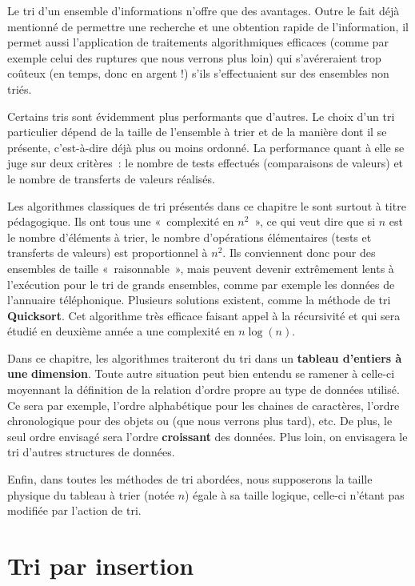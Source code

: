 	Le tri d’un ensemble d’informations n’offre que des avantages. Outre le
	fait déjà mentionné de permettre une recherche et une obtention rapide
	de l’information, il permet aussi l’application de traitements
	algorithmiques efficaces (comme par exemple celui des ruptures que nous
	verrons plus loin) qui s’avéreraient trop coûteux (en temps, donc en
	argent !) s’ils s’effectuaient sur des ensembles non triés.

	Certains tris sont évidemment plus performants que d’autres. Le choix
	d’un tri particulier dépend de la taille de l’ensemble à trier et de la
	manière dont il se présente, c’est-à-dire déjà plus ou moins ordonné.
	La performance quant à elle se juge sur deux critères~: le nombre de
	tests effectués (comparaisons de valeurs) et le nombre de transferts de
	valeurs réalisés. 
	
	Les algorithmes classiques de tri présentés dans ce chapitre le sont
	surtout à titre pédagogique. Ils ont tous une «~complexité en
	$n^2$~», ce qui veut dire que si $n$ est le nombre
	d’éléments à trier, le nombre d’opérations élémentaires (tests et
	transferts de valeurs) est proportionnel à $n^2$. Ils conviennent
	donc pour des ensembles de taille «~raisonnable~», mais peuvent devenir
	extrêmement lents à l’exécution pour le tri de grands ensembles, comme
	par exemple les données de l’annuaire téléphonique. Plusieurs solutions
	existent, comme la méthode de tri \textbf{Quicksort}. Cet algorithme
	très efficace faisant appel à la récursivité et qui sera étudié en
	deuxième année a une complexité en $n \log(n)$. 

	Dans ce chapitre, les algorithmes traiteront du tri dans un
	\textbf{tableau d’entiers à une }\textbf{dimension}. Toute autre
	situation peut bien entendu se ramener à celle-ci moyennant la
	définition de la relation d’ordre propre au type de données utilisé. Ce
	sera par exemple, l’ordre alphabétique pour les chaines de caractères,
	l’ordre chronologique pour des objets  ou
	 (que nous verrons
	plus tard), etc. De plus, le seul ordre envisagé sera l’ordre
	\textbf{croissant} des données. Plus loin, on envisagera le tri 
	d'autres structures de données.

	Enfin, dans toutes les méthodes de tri abordées, nous supposerons la
	taille physique du tableau à trier (notée $n$) égale à sa taille
	logique, celle-ci n’étant pas modifiée par l’action de tri.


\section{Tri par insertion}

